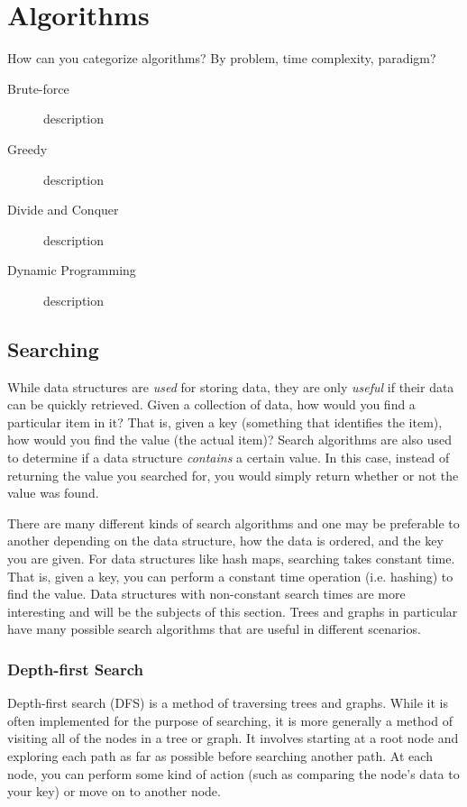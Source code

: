 \chapter{Algorithms}

How can you categorize algorithms? By problem, time complexity, paradigm? 

\begin{description}
    \item[Brute-force] description
    \item[Greedy] description
    \item[Divide and Conquer] description
    \item[Dynamic Programming] description
\end{description}

\section{Searching}

While data structures are \textit{used} for storing data, they are only \textit{useful} if their data can be quickly retrieved. Given a collection of data, how would you find a particular item in it? That is, given a key (something that identifies the item), how would you find the value (the actual item)? Search algorithms are also used to determine if a data structure \textit{contains} a certain value. In this case, instead of returning the value you searched for, you would simply return whether or not the value was found.

There are many different kinds of search algorithms and one may be preferable to another depending on the data structure, how the data is ordered, and the key you are given. For data structures like hash maps, searching takes constant time. That is, given a key, you can perform a constant time operation (i.e. hashing) to find the value. Data structures with non-constant search times are more interesting and will be the subjects of this section. Trees and graphs in particular have many possible search algorithms that are useful in different scenarios.

\subsection{Depth-first Search}

Depth-first search (DFS) is a method of traversing trees and graphs. While it is often implemented for the purpose of searching, it is more generally a method of visiting all of the nodes in a tree or graph. It involves starting at a root node and exploring each path as far as possible before searching another path. At each node, you can perform some kind of action (such as comparing the node's data to your key) or move on to another node.

